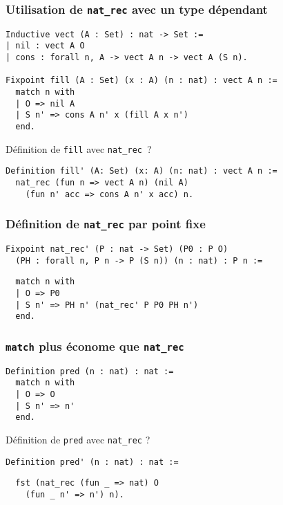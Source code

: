 \documentclass{beamer}
\begin{document}
\begin{frame}[fragile]
  \frametitle{Utilisation de \texttt{nat_rec} avec un type dépendant}

\begin{verbatim}
Inductive vect (A : Set) : nat -> Set :=
| nil : vect A O
| cons : forall n, A -> vect A n -> vect A (S n).

Fixpoint fill (A : Set) (x : A) (n : nat) : vect A n :=
  match n with
  | O => nil A
  | S n' => cons A n' x (fill A x n')
  end.
\end{verbatim}

Définition de \texttt{fill} avec \texttt{nat_rec} ?

\pause

\begin{verbatim}
Definition fill' (A: Set) (x: A) (n: nat) : vect A n :=
  nat_rec (fun n => vect A n) (nil A)
    (fun n' acc => cons A n' x acc) n.
\end{verbatim}
\end{frame}
\begin{frame}[fragile]
  \frametitle{Définition de \texttt{nat_rec} par point fixe}

\begin{verbatim}
Fixpoint nat_rec' (P : nat -> Set) (P0 : P O)
  (PH : forall n, P n -> P (S n)) (n : nat) : P n :=
\end{verbatim}
\pause
\begin{verbatim}
  match n with
  | O => P0
  | S n' => PH n' (nat_rec' P P0 PH n')
  end.
\end{verbatim}
\end{frame}
\begin{frame}[fragile]
  \frametitle{\texttt{match} plus économe que \texttt{nat_rec}}

\begin{verbatim}
Definition pred (n : nat) : nat :=
  match n with
  | O => O
  | S n' => n'
  end.
\end{verbatim}
\vfill
Définition de \texttt{pred} avec \texttt{nat_rec} ?
\begin{verbatim}
Definition pred' (n : nat) : nat :=
\end{verbatim}
\pause
\begin{verbatim}
  fst (nat_rec (fun _ => nat) O
    (fun _ n' => n') n).
\end{verbatim}

\end{frame}
\end{document}
